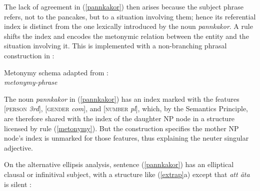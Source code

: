 \documentclass[output=paper,biblatex,babelshorthands,newtxmath,draftmode,colorlinks,citecolor=brown]{langscibook}
\begin{document}
The lack of agreement in (\ref{pannkakor}) then arises because the subject phrase refers, not to the pancakes, but to a situation involving them; hence its referential index is distinct from the one lexically introduced by the noun \textit{pannkakor}.  A rule shifts the index and encodes the metonymic relation between the entity and the situation involving it.  This  is implemented with a non-branching phrasal construction in \citet[82]{Wechsler:2013}:

\newpage
\ea	
\label{metonymy}
Metonymy schema adapted from \citet[82]{Wechsler:2013}:\\
\textit{metonymy-phrase} \impl \\
\z

\noindent
The noun \emph{pannkakor} in (\ref{pannkakor}) has an index marked with the features [\textsc{person}  \textit{3rd}], [\textsc{gender} \textit{com}], and [\textsc{number} \textit{pl}], which, by the Semantics Principle, are therefore shared with the index of the daughter NP node in a structure licensed by rule (\ref{metonymy}).  But the construction  specifies the mother NP node's index is unmarked for those features, thus explaining the neuter singular adjective.    

On the alternative ellipsis analysis, sentence (\ref{pannkakor}) has an elliptical clausal or infinitival subject, with a structure like (\ref{extrap}a) except that \emph{att \"{a}ta} is silent \citep{Faarlund:1977, Enger:2004,Josefsson:2009}:  

\begin{exe} 
\ex\label{extrap}
\begin{xlist}
\end{xlist}
\end{exe}
\end{document}

